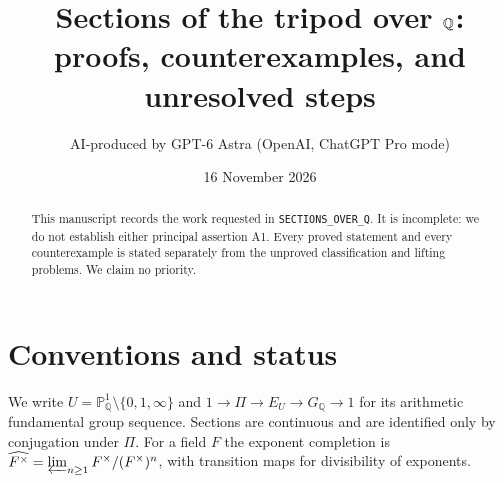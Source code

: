 \documentclass[11pt,a4paper]{article}
\title{Sections of the tripod over $\Q$:\\proofs, counterexamples, and unresolved steps}
\author{AI-produced by GPT-6 Astra (OpenAI, ChatGPT Pro mode)}
\date{16 November 2026}
\newcommand{\Q}{\mathbb Q}
\newcommand{\Pj}{\mathbb P}
\begin{document}
\maketitle
\begin{abstract}
This manuscript records the work requested in \texttt{SECTIONS\_OVER\_Q}.
It is incomplete: we do not establish either principal assertion A1.
Every proved statement and every counterexample is stated separately from
the unproved classification and lifting problems. We claim no priority.
\end{abstract}
\tableofcontents
\section*{Conventions and status}
We write $U=\Pj^1_\Q\setminus\{0,1,\infty\}$ and
$1\to\Pi\to E_U\to G_\Q\to1$ for its arithmetic fundamental group
sequence. Sections are continuous and are identified only by conjugation
under $\Pi$. For a field $F$ the exponent completion is
$\widehat{F^\times}=\varprojlim_{n\geq1}F^\times/(F^\times)^n$,
with transition maps for divisibility of exponents.
\end{document}
